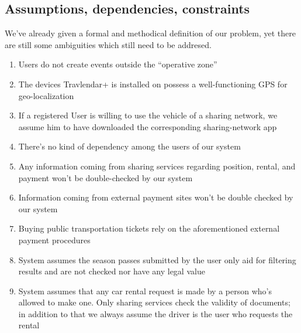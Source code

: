 \subsection{Assumptions, dependencies, constraints}

	We've already given a formal and methodical definition of our problem, yet there are still some ambiguities which still need to be addresed.


		\begin{enumerate}
		
			\item Users do not create events outside the “operative zone”

			\item The devices Travlendar+ is installed on possess a well-functioning GPS for geo-localization

			\item If a registered User is willing to use the vehicle of a sharing network, we assume him to have downloaded the corresponding sharing-network app

			\item There’s no kind of dependency among the users of our system

			\item Any information coming from sharing services regarding position, rental, and payment won’t be double-checked by our system

			\item Information coming from external payment sites won’t be double checked by our system

			\item Buying public transportation tickets rely on the aforementioned external payment procedures

			\item System assumes the season passes submitted by the user only aid for filtering results and are not checked nor have any legal value

			\item System assumes that any car rental request is made by a person who’s allowed to make one. Only sharing services check the validity of documents; in addition to that we always assume the driver is the user who requests the rental

			
		\end{enumerate}

			
			


		

